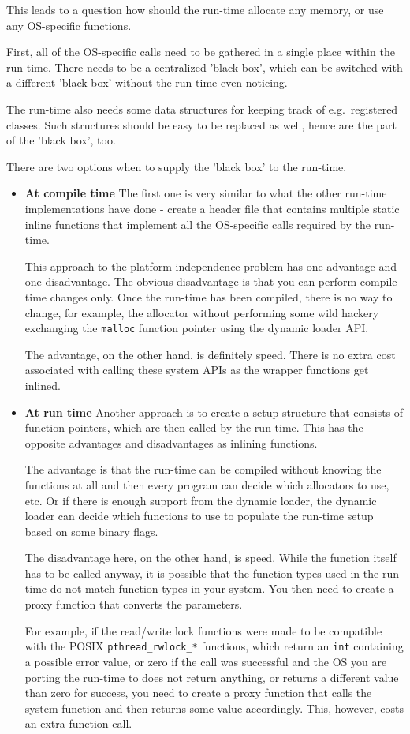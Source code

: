 This leads to a question how should the run-time allocate any memory, or use any OS-specific functions.

First, all of the OS-specific calls need to be gathered in a single place within the run-time. There needs to be a centralized 'black box', which can be switched with a different 'black box' without the run-time even noticing.

The run-time also needs some data structures for keeping track of e.g.\ registered classes. Such structures should be easy to be replaced as well, hence are the part of the 'black box', too.

There are two options when to supply the 'black box' to the run-time.

\begin{itemize}
\item{\bf{At compile time}}
The first one is very similar to what the other run-time implementations have done - create a header file that contains multiple static inline functions that implement all the OS-specific calls required by the run-time.

This approach to the platform-independence problem has one advantage and one disadvantage. The obvious disadvantage is that you can perform compile-time changes only. Once the run-time has been compiled, there is no way to change, for example, the allocator without performing some wild hackery exchanging the \verb=malloc= function pointer using the dynamic loader API.

The advantage, on the other hand, is definitely speed. There is no extra cost associated with calling these system APIs as the wrapper functions get inlined.

\item{\bf{At run time}}
Another approach is to create a setup structure that consists of function pointers, which are then called by the run-time. This has the opposite advantages and disadvantages as inlining functions.

The advantage is that the run-time can be compiled without knowing the functions at all and then every program can decide which allocators to use, etc. Or if there is enough support from the dynamic loader, the dynamic loader can decide which functions to use to populate the run-time setup based on some binary flags.

The disadvantage here, on the other hand, is speed. While the function itself has to be called anyway, it is possible that the function types used in the run-time do not match function types in your system. You then need to create a proxy function that converts the parameters.

For example, if the read/write lock functions were made to be compatible with the POSIX \verb=pthread_rwlock_*= functions, which return an \verb=int= containing a possible error value, or zero if the call was successful and the OS you are porting the run-time to does not return anything, or returns a different value than zero for success, you need to create a proxy function that calls the system function and then returns some value accordingly. This, however, costs an extra function call.
\end{itemize}


